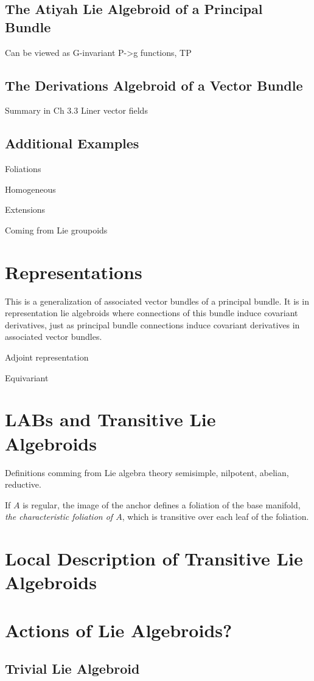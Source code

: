\subsection{The Atiyah Lie Algebroid of a Principal Bundle}

Can be viewed as G-invariant P->g functions, TP 

\subsection{The Derivations Algebroid of a Vector Bundle}

Summary in Ch 3.3 Liner vector fields

\subsection{Additional Examples}

Foliations

Homogeneous

Extensions

Coming from Lie groupoids

\section{Representations}

This is a generalization of associated vector bundles of a principal bundle. It is in representation lie algebroids where connections of this bundle induce covariant derivatives, just as principal bundle connections induce covariant derivatives in associated vector bundles.

Adjoint representation

Equivariant
\section{LABs and Transitive Lie Algebroids}

Definitions comming from Lie algebra theory semisimple, nilpotent, abelian, reductive.

If $A$ is regular, the image of the anchor defines a foliation of the base manifold, \emph{the characteristic foliation of $A$}, which is transitive over each leaf of the foliation.

\section{Local Description of Transitive Lie Algebroids}

\section{Actions of Lie Algebroids?}\subsection{Trivial Lie Algebroid}
